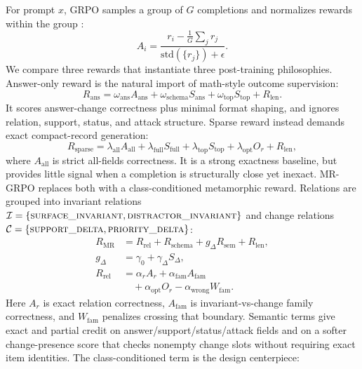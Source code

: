 \documentclass[letterpaper]{article}
\newcommand{\method}{MR-GRPO}
\newcommand{\lab}[1]{\textsc{#1}}
\begin{document}
For prompt $x$, GRPO samples a group of $G$ completions and normalizes rewards within the group \cite{shao2024deepseekmath}:
\begin{equation}
A_i=\frac{r_i-\frac{1}{G}\sum_{j}r_j}{\mathrm{std}(\{r_j\})+\epsilon}.
\end{equation}
We compare three rewards that instantiate three post-training philosophies. Answer-only reward is the natural import of math-style outcome supervision:
\begin{equation}
R_{\mathrm{ans}}=\omega_{\mathrm{ans}}A_{\mathrm{ans}}+\omega_{\mathrm{schema}}S_{\mathrm{ans}}+\omega_{\mathrm{top}}S_{\mathrm{top}}+R_{\mathrm{len}}.
\end{equation}
It scores answer-change correctness plus minimal format shaping, and ignores relation, support, status, and attack structure. Sparse reward instead demands exact compact-record generation:
\begin{equation}
R_{\mathrm{sparse}}=\lambda_{\mathrm{all}}A_{\mathrm{all}}+\lambda_{\mathrm{full}}S_{\mathrm{full}}+\lambda_{\mathrm{top}}S_{\mathrm{top}}+\lambda_{\mathrm{opt}}O_r+R_{\mathrm{len}},
\end{equation}
where $A_{\mathrm{all}}$ is strict all-fields correctness. It is a strong exactness baseline, but provides little signal when a completion is structurally close yet inexact. \method{} replaces both with a class-conditioned metamorphic reward. Relations are grouped into invariant relations $\mathcal{I}=\{\lab{surface\_invariant},\lab{distractor\_invariant}\}$ and change relations $\mathcal{C}=\{\lab{support\_delta},\lab{priority\_delta}\}$:
\begin{align}
R_{\mathrm{MR}} &= R_{\mathrm{rel}}+R_{\mathrm{schema}}+g_{\Delta}R_{\mathrm{sem}}+R_{\mathrm{len}}, \nonumber\\
g_{\Delta} &= \gamma_0+\gamma_{\Delta}S_{\Delta}, \nonumber\\
R_{\mathrm{rel}} &= \alpha_r A_r+\alpha_{\mathrm{fam}}A_{\mathrm{fam}} \nonumber\\
&\quad +\alpha_{\mathrm{opt}}O_r-\alpha_{\mathrm{wrong}}W_{\mathrm{fam}}.
\end{align}
Here $A_r$ is exact relation correctness, $A_{\mathrm{fam}}$ is invariant-vs-change family correctness, and $W_{\mathrm{fam}}$ penalizes crossing that boundary. Semantic terms give exact and partial credit on answer/support/status/attack fields and on a softer change-presence score that checks nonempty change slots without requiring exact item identities. The class-conditioned term is the design centerpiece:
\end{document}
